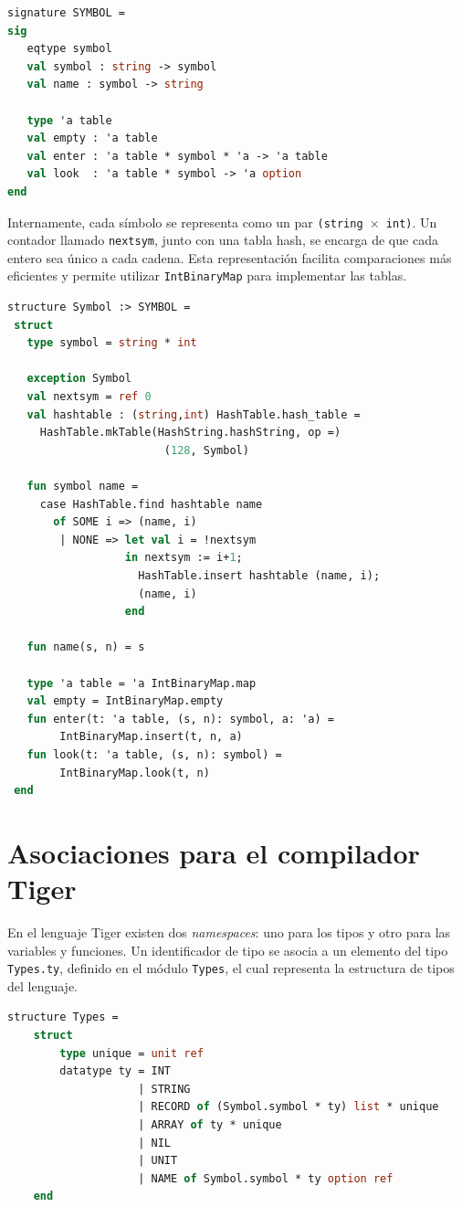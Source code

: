 \documentclass[runningheads]{llncs}
\begin{document}
\begin{lstlisting}[language=ML, caption={Firma del módulo SYMBOL}, captionpos=b]
signature SYMBOL =
sig
   eqtype symbol
   val symbol : string -> symbol
   val name : symbol -> string

   type 'a table
   val empty : 'a table
   val enter : 'a table * symbol * 'a -> 'a table
   val look  : 'a table * symbol -> 'a option
end
\end{lstlisting}

Internamente, cada símbolo se representa como un par \texttt{(string $\times$ int)}. Un contador llamado \texttt{nextsym}, junto con una tabla hash, se encarga de que cada entero sea único a cada cadena. Esta representación facilita comparaciones más eficientes y permite utilizar \texttt{IntBinaryMap} para implementar las tablas.

\begin{lstlisting}[language=ML, caption={Implementación de SYMBOL}, captionpos=b]
 structure Symbol :> SYMBOL =
 struct
   type symbol = string * int

   exception Symbol
   val nextsym = ref 0
   val hashtable : (string,int) HashTable.hash_table =
     HashTable.mkTable(HashString.hashString, op =)
                        (128, Symbol)

   fun symbol name =
     case HashTable.find hashtable name
       of SOME i => (name, i)
        | NONE => let val i = !nextsym
                  in nextsym := i+1;
                    HashTable.insert hashtable (name, i);
                    (name, i)
                  end

   fun name(s, n) = s

   type 'a table = 'a IntBinaryMap.map
   val empty = IntBinaryMap.empty
   fun enter(t: 'a table, (s, n): symbol, a: 'a) =
        IntBinaryMap.insert(t, n, a)
   fun look(t: 'a table, (s, n): symbol) =
        IntBinaryMap.look(t, n)
 end
\end{lstlisting}

\section{Asociaciones para el compilador Tiger}
En el lenguaje Tiger existen dos \textit{namespaces}: uno para los tipos y otro para las variables y funciones. Un identificador de tipo se asocia a un elemento del tipo \texttt{Types.ty}, definido en el módulo \texttt{Types}, el cual representa la estructura de tipos del lenguaje.

\begin{lstlisting}[language=ML, caption={Definición del módulo Types}, captionpos=b]
    structure Types = 
    struct 
        type unique = unit ref
        datatype ty = INT
                    | STRING
                    | RECORD of (Symbol.symbol * ty) list * unique
                    | ARRAY of ty * unique
                    | NIL
                    | UNIT
                    | NAME of Symbol.symbol * ty option ref
    end
\end{lstlisting}
\end{document}
